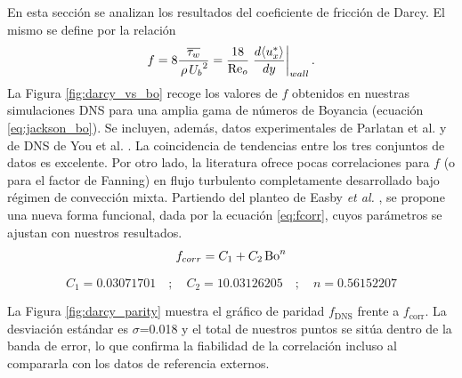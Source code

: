 En esta sección se analizan los resultados del coeficiente de fricción de Darcy. El mismo se define por la relación
\begin{equation}
f = 8 \frac{ \overline{\tau_w}}{\hspace{0.5mm} \rho \hspace{0.5mm} {U_b}^2 }  = \frac{18}{\text{Re}_o} \left.\frac{d \langle u^*_x \rangle}{dy}\right\vert_{wall} \text{.}
\label{eq:darcy}
\end{equation}
La Figura \ref{fig:darcy_vs_bo} recoge los valores de $f$ obtenidos en nuestras simulaciones DNS para una amplia gama de números de Boyancia (ecuación \ref{eq:jackson_bo}). Se incluyen, además, datos experimentales de Parlatan et al. \cite{parlatan1996buoyancy} y de DNS de You et al. \cite{you2003direct}. La coincidencia de tendencias entre los tres conjuntos de datos es excelente. Por otro lado, la literatura ofrece pocas correlaciones para $f$ (o para el factor de Fanning) en flujo turbulento completamente desarrollado bajo régimen de convección mixta. Partiendo del planteo de Easby \textit{et al.} \cite{easby1978effect}, se propone una nueva forma funcional, dada por la ecuación \ref{eq:fcorr}, cuyos parámetros se ajustan con nuestros resultados.
\begin{equation}
f_{corr} = C_1 + C_2 \hspace*{0.5mm} \text{Bo}^n
\label{eq:fcorr}
\end{equation}

\begin{small}
$$
C_1 = 0.03071701 \quad ; \quad C_2 = 10.03126205 \quad ; \quad n = 0.56152207
$$
\end{small}

La Figura \ref{fig:darcy_parity} muestra el gráfico de paridad $f_{\text{DNS}}$ frente a $f_{\text{corr}}$. La desviación estándar es $\sigma$=0.018 y el total de nuestros puntos se sitúa dentro de la banda de error, lo que confirma la fiabilidad de la correlación incluso al compararla con los datos de referencia externos.

